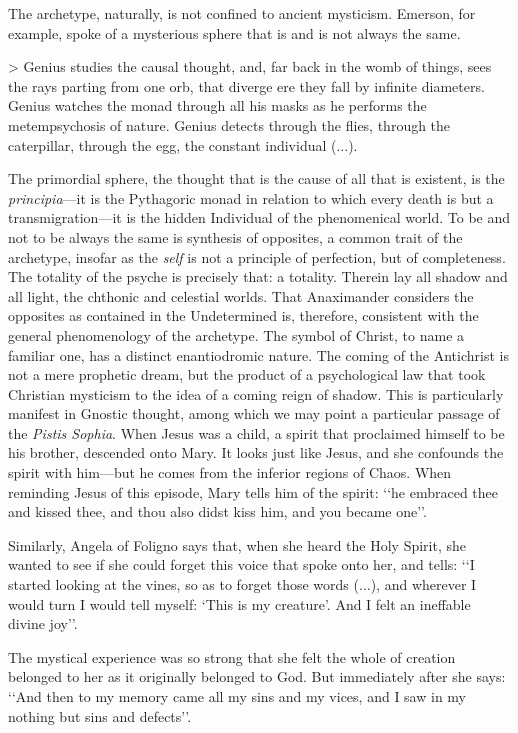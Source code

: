 \documentclass[a4paper]{article}
\begin{document}
The archetype, naturally, is not confined to ancient mysticism. Emerson, for
example, spoke of a mysterious sphere that is and is not always the same.

> Genius studies the causal thought, and, far back in the womb of things, sees
the rays parting from one orb, that diverge ere they fall by infinite diameters.
Genius watches the monad through all his masks as he performs the metempsychosis
of nature. Genius detects through the flies, through the caterpillar, through
the egg, the constant individual (...).

The primordial sphere, the thought that is the cause of all that is existent, is
the \textit{principia}---it is the Pythagoric monad in relation to which every
death is but a transmigration---it is the hidden Individual of the phenomenical
world. To be and not to be always the same is synthesis of opposites, a common
trait of the archetype, insofar as the \textit{self} is not a principle of
perfection, but of completeness. The totality of the psyche is precisely that: a
totality. Therein lay all shadow and all light, the chthonic and celestial
worlds.  That Anaximander considers the opposites as contained in the
Undetermined is, therefore, consistent with the general phenomenology of the
archetype. The symbol of Christ, to name a familiar one, has a distinct
enantiodromic nature. The coming of the Antichrist is not a mere prophetic
dream, but the product of a psychological law that took Christian mysticism to
the idea of a coming reign of shadow. This is particularly manifest in Gnostic
thought, among which we may point a particular passage of the \textit{Pistis
Sophia}. When Jesus was a child, a spirit that proclaimed himself to be his
brother, descended onto Mary. It looks just like Jesus, and she confounds the
spirit with him---but he comes from the inferior regions of Chaos. When
reminding Jesus of this episode, Mary tells him of the spirit: \lq\lq he
embraced thee and kissed thee, and thou also didst kiss him, and you became
one\rq\rq{}.

Similarly, Angela of Foligno says that, when she heard the Holy Spirit, she
wanted to see if she could forget this voice that spoke onto her, and tells:
\lq\lq I started looking at the vines, so as to forget those words ($\ldots$),
and wherever I would turn I would tell myself: \lq This is my creature\rq{}. And
I felt an ineffable divine joy\rq\rq{}.

The mystical experience was so strong that she felt the whole of creation
belonged to her as it originally belonged to God. But immediately after she
says: \lq\lq And then to my memory came all my sins and my vices, and I saw in
my nothing but sins and defects\rq\rq{}. 
\end{document}
